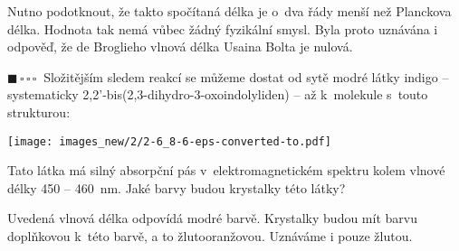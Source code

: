 \documentclass{book}
\newcommand{\jeden}{$\blacksquare \, \square \, \square \, \square \; \; $}
\renewenvironment{quotation}{\par}{\par} %
\begin{document}
Nutno podotknout, že takto spočítaná délka je o~dva řády menší než Planckova délka. Hodnota tak nemá vůbec žádný fyzikální smysl. Byla proto uznávána i odpověď, že de Broglieho vlnová délka Usaina Bolta je nulová.

\hrulefill %
\begin{quotation}
\jeden Složitějším sledem reakcí se můžeme
dostat od sytě modré látky indigo -- systematicky 2,2’-bis(2,3-dihydro-3-oxoindolyliden) -- až k~molekule s~touto strukturou: 

\begin{center}
\texttt{[image: images\_new/2/2-6\_8-6-eps-converted-to.pdf]}
\par\end{center}

Tato látka má silný absorpční pás v~elektromagnetickém spektru kolem
vlnové délky 450 -- 460~nm. Jaké barvy budou krystalky této látky?
\end{quotation} \dotfill \par 
Uvedená vlnová délka odpovídá modré barvě. Krystalky budou mít barvu
doplňkovou k~této barvě, a to žlutooranžovou. Uznáváme i pouze žlutou.
\end{document}
